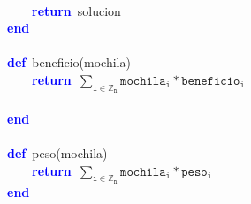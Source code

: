 \mbox{} \\
\mbox{}\ \ \ \ \textbf{\textcolor{Blue}{return}}\ solucion \\
\mbox{}\textbf{\textcolor{Blue}{end}} \\
\mbox{} \\
\mbox{}\textbf{\textcolor{Blue}{def}}\ beneficio\textcolor{BrickRed}{(}mochila\textcolor{BrickRed}{)} \\
\mbox{}\ \ \ \ \textbf{\textcolor{Blue}{return}}\ $\mathtt{\sum_{i \in \mathbb{Z}_n} mochila_i * beneficio_i}$ \\ \\
\mbox{}\textbf{\textcolor{Blue}{end}} \\
\mbox{} \\
\mbox{}\textbf{\textcolor{Blue}{def}}\ peso\textcolor{BrickRed}{(}mochila\textcolor{BrickRed}{)} \\
\mbox{}\ \ \ \ \textbf{\textcolor{Blue}{return}}\ $\mathtt{\sum_{i \in \mathbb{Z}_n} mochila_i * peso_i}$ \\
\mbox{}\textbf{\textcolor{Blue}{end}} \\
\mbox{} \\
\mbox{}\ \ \ \ \ \ \ \ \ \ \ \  \\
\mbox{}
